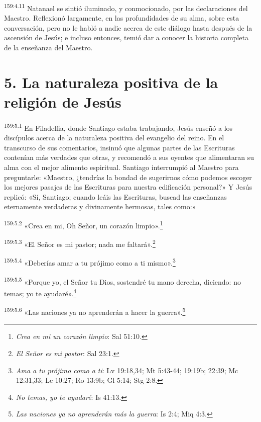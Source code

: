 \par
\textsuperscript{159:4.11} Natanael se sintió iluminado, y conmocionado, por las declaraciones del Maestro. Reflexionó largamente, en las profundidades de su alma, sobre esta conversación, pero no le habló a nadie acerca de este diálogo hasta después de la ascensión de Jesús; e incluso entonces, temió dar a conocer la historia completa de la enseñanza del Maestro.

\section*{5. La naturaleza positiva de la religión de Jesús}
\par
\textsuperscript{159:5.1} En Filadelfia, donde Santiago estaba trabajando, Jesús enseñó a los discípulos acerca de la naturaleza positiva del evangelio del reino. En el transcurso de sus comentarios, insinuó que algunas partes de las Escrituras contenían más verdades que otras, y recomendó a sus oyentes que alimentaran su alma con el mejor alimento espiritual. Santiago interrumpió al Maestro para preguntarle: «Maestro, ¿tendrías la bondad de sugerirnos cómo podemos escoger los mejores pasajes de las Escrituras para nuestra edificación personal?» Y Jesús replicó: «Sí, Santiago; cuando leáis las Escrituras, buscad las enseñanzas eternamente verdaderas y divinamente hermosas, tales como:»

\par
\textsuperscript{159:5.2} «Crea en mi, Oh Señor, un corazón limpio».\footnote{\textit{Crea en mi un corazón limpio}: Sal 51:10.}

\par
\textsuperscript{159:5.3} «El Señor es mi pastor; nada me faltará».\footnote{\textit{El Señor es mi pastor}: Sal 23:1.}

\par
\textsuperscript{159:5.4} «Deberías amar a tu prójimo como a ti mismo».\footnote{\textit{Ama a tu prójimo como a ti}: Lv 19:18,34; Mt 5:43-44; 19:19b; 22:39; Mc 12:31,33; Lc 10:27; Ro 13:9b; Gl 5:14; Stg 2:8.}

\par
\textsuperscript{159:5.5} «Porque yo, el Señor tu Dios, sostendré tu mano derecha, diciendo: no temas; yo te ayudaré».\footnote{\textit{No temas, yo te ayudaré}: Is 41:13.}

\par
\textsuperscript{159:5.6} «Las naciones ya no aprenderán a hacer la guerra».\footnote{\textit{Las naciones ya no aprenderán más la guerra}: Is 2:4; Miq 4:3.}

